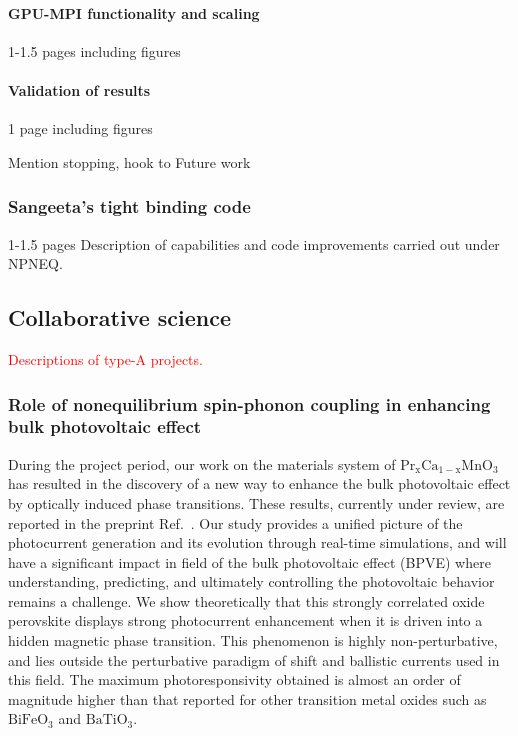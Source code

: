 \paragraph{GPU-MPI functionality and scaling}
1-1.5 pages including figures
\paragraph{Validation of results}
1 page including figures

Mention stopping, hook to Future work

\subsubsection{Sangeeta's tight binding code}
1-1.5 pages Description of capabilities and code improvements carried out under NPNEQ.

\subsection{Collaborative science}
\textcolor{red}{Descriptions of type-A projects.}

\subsubsection{Role of nonequilibrium spin-phonon coupling in enhancing bulk photovoltaic effect }
During the project period, our work on the materials system of \(\mathrm{Pr_xCa_{1-x}MnO_3}\) has resulted in the discovery of a new way to enhance the bulk photovoltaic effect by optically induced phase transitions. 
These results, currently under review, are reported in the preprint Ref.~\cite{Rajpurohit2021}. 
Our study provides a unified picture of the photocurrent generation and its evolution through real-time simulations, and will have a significant impact in field of the bulk photovoltaic effect (BPVE) where understanding, predicting, and ultimately controlling the photovoltaic behavior remains a challenge.
We show theoretically that this strongly correlated oxide perovskite displays strong photocurrent enhancement when it is driven into a hidden magnetic phase transition.
This phenomenon is highly non-perturbative, and lies outside the perturbative paradigm of shift and ballistic currents used in this field. 
The maximum photoresponsivity obtained is almost an order of magnitude higher than that reported for other transition metal oxides such as \(\mathrm{BiFeO_3}\) and \(\mathrm{BaTiO_3}\).

